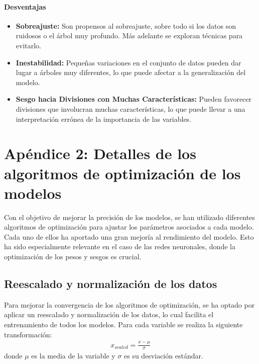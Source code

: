 \documentclass[11pt]{book}
\newcommand{\clearemptydoublepage}{\newpage{\pagestyle{empty}\cleardoublepage}}
\theoremstyle{plain} %
\theoremstyle{definition} %
\begin{document}
\subsubsection*{Desventajas}
\begin{itemize}
   \item \textbf{Sobreajuste:} Son propensos al sobreajuste, sobre todo si los 
   datos son ruidosos o el árbol muy profundo. Más adelante se exploran 
   técnicas para evitarlo.
   \item \textbf{Inestabilidad:} Pequeñas variaciones en el conjunto de 
   datos pueden dar lugar a árboles muy diferentes, lo que 
   puede afectar a la generalización del modelo.
   \item \textbf{Sesgo hacia Divisiones con Muchas Características:} Pueden
   favorecer divisiones que involucran muchas características, lo que puede
   llevar a una interpretación errónea de la importancia de las variables.
\end{itemize}



\setcounter{chapter}{2}
\setcounter{section}{0}


\chapter{Apéndice 2: Detalles de los algoritmos de optimización de los modelos}
\label{ap:optimizacion}
Con el objetivo de mejorar la precisión de los modelos, se han utilizado 
diferentes algoritmos de optimización para ajustar los parámetros asociados 
a cada modelo. Cada uno de ellos ha aportado una gran mejoría al rendimiento 
del modelo. Esto ha sido especialmente relevante en el caso de las 
redes neuronales, donde la optimización de los pesos y sesgos es crucial.
\section{Reescalado y normalización de los datos}
Para mejorar la convergencia de los algoritmos de optimización, se ha
optado por aplicar un reescalado y normalización de los datos, lo cual 
facilita el entrenamiento de todos los modelos. Para cada variable se realiza 
la siguiente transformación: 
\begin{align*}
   x_{scaled} = \frac{x - \mu}{\sigma}
\end{align*}
donde $\mu$ es la media de la variable y $\sigma$ es su desviación estándar. 
\end{document}
